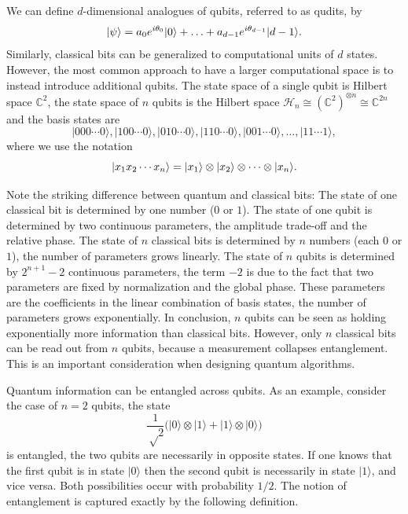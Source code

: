 We can define $d$-dimensional analogues of qubits, referred to as qudits, by
\begin{equation}
  \lvert\psi\rangle = a_0 e^{i\theta_0} \lvert0\rangle + \ldots + a_{d-1} e^{i \theta_{d-1}} \lvert d-1\rangle.
\end{equation}
Similarly, classical bits can be generalized to computational units of $d$ states. However, the most common approach to have a larger computational space is to instead introduce additional qubits. The state space of a single qubit is Hilbert space $\mathbb{C}^2$, the state space of $n$ qubits is the Hilbert space $ℋ_n \cong (\mathbb{C}^2)^{\otimes n} \cong \mathbb{C}^{2n}$ and the basis states are
\begin{equation}
  |000⋯0⟩, |100⋯0⟩, |010⋯0⟩, |110⋯0⟩, |001⋯0⟩, …, |11⋯1⟩,
\end{equation}
where we use the notation
\begin{equation}
  \lvert x_1x_2\cdots x_n\rangle = \lvert x_1\rangle\otimes\lvert x_2\rangle\otimes\cdots\otimes\lvert x_n\rangle.
\end{equation}

Note the striking difference between quantum and classical bits:
The state of one classical bit is determined by one number ($0$ or $1$).
The state of one qubit is determined by two continuous parameters, the amplitude trade-off and the relative phase.
The state of $n$ classical bits is determined by $n$ numbers (each $0$ or $1$), the number of parameters grows linearly.
The state of $n$ qubits is determined by $2^{n+1}-2$ continuous parameters, the term $-2$ is due to the fact that two parameters are fixed by normalization and the global phase. These parameters are the coefficients in the linear combination of basis states, the number of parameters grows exponentially. In conclusion, $n$ qubits can be seen as holding exponentially more information than classical bits. However, only $n$ classical bits can be read out from $n$ qubits, because a measurement collapses entanglement. This is an important consideration when designing quantum algorithms.

Quantum information can be entangled across qubits. As an example, consider the case of $n = 2$ qubits, the state
\begin{equation}
  \frac{1}{√2}\big(|0⟩⊗|1⟩ + |1⟩⊗|0⟩\big)
\end{equation}
is entangled, the two qubits are necessarily in opposite states. If one knows that the first qubit is in state $|0⟩$ then the second qubit is necessarily in state $|1⟩$, and vice versa. Both possibilities occur with probability $1/2$. The notion of entanglement is captured exactly by the following definition.


